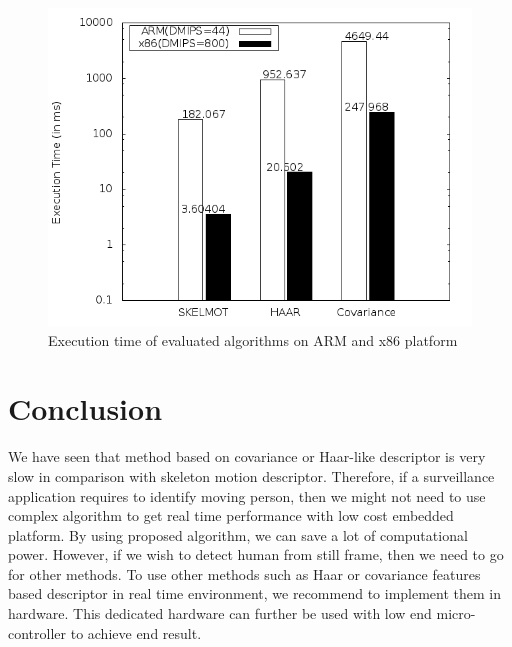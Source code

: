 \begin{figure}[!t]
\centering
\includegraphics[scale=0.30]{Figures/pipeline_execution_time}
\caption{Execution time of evaluated algorithms on ARM and x86
platform}
\label{pipeline_execution_time}
\end{figure}
\section{Conclusion}
\indent We have seen that method based on covariance or Haar-like
descriptor is very slow in comparison with skeleton motion descriptor.
Therefore, if a surveillance application requires to identify moving
person, then we might not need to use complex algorithm to get real time
performance with low cost embedded platform. By using proposed
algorithm, we can save a lot of computational power. However, if we wish
to detect human from still frame, then we need to go for other methods.
To use other methods such as Haar or covariance features based
descriptor in real time environment, we recommend to implement them in
hardware. This dedicated hardware can further be used with low end
micro-controller to achieve end result.
